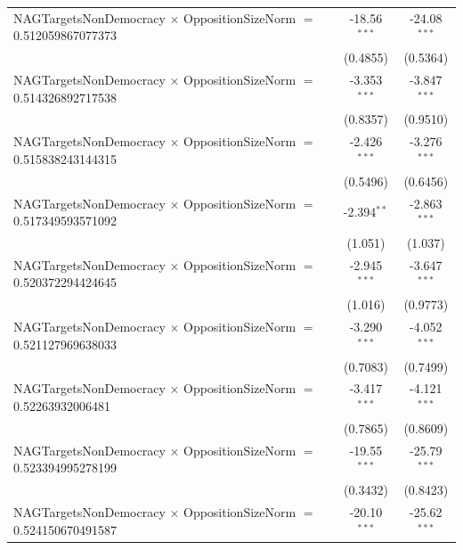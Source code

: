 \begin{tabular}{lcc}
   NAGTargetsNonDemocracy $\times$ OppositionSizeNorm $=$ 0.512059867077373     & -18.56$^{***}$       & -24.08$^{***}$\\   
                                                                                & (0.4855)             & (0.5364)\\   
   NAGTargetsNonDemocracy $\times$ OppositionSizeNorm $=$ 0.514326892717538     & -3.353$^{***}$       & -3.847$^{***}$\\   
                                                                                & (0.8357)             & (0.9510)\\   
   NAGTargetsNonDemocracy $\times$ OppositionSizeNorm $=$ 0.515838243144315     & -2.426$^{***}$       & -3.276$^{***}$\\   
                                                                                & (0.5496)             & (0.6456)\\   
   NAGTargetsNonDemocracy $\times$ OppositionSizeNorm $=$ 0.517349593571092     & -2.394$^{**}$        & -2.863$^{***}$\\   
                                                                                & (1.051)              & (1.037)\\   
   NAGTargetsNonDemocracy $\times$ OppositionSizeNorm $=$ 0.520372294424645     & -2.945$^{***}$       & -3.647$^{***}$\\   
                                                                                & (1.016)              & (0.9773)\\   
   NAGTargetsNonDemocracy $\times$ OppositionSizeNorm $=$ 0.521127969638033     & -3.290$^{***}$       & -4.052$^{***}$\\   
                                                                                & (0.7083)             & (0.7499)\\   
   NAGTargetsNonDemocracy $\times$ OppositionSizeNorm $=$ 0.52263932006481      & -3.417$^{***}$       & -4.121$^{***}$\\   
                                                                                & (0.7865)             & (0.8609)\\   
   NAGTargetsNonDemocracy $\times$ OppositionSizeNorm $=$ 0.523394995278199     & -19.55$^{***}$       & -25.79$^{***}$\\   
                                                                                & (0.3432)             & (0.8423)\\   
   NAGTargetsNonDemocracy $\times$ OppositionSizeNorm $=$ 0.524150670491587     & -20.10$^{***}$       & -25.62$^{***}$\\   

\end{tabular}
